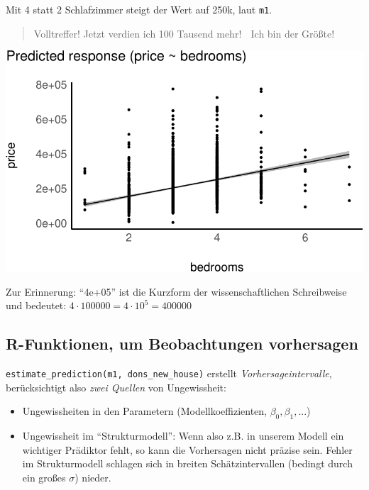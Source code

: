 \documentclass[
  a4paper,
  DIV=11]{scrreprt}
\providecommand{\tightlist}{%
  \setlength{\itemsep}{0pt}\setlength{\parskip}{0pt}}\usepackage{longtable,booktabs,array}
\theoremstyle{definition}
\theoremstyle{remark}
\begin{document}
Mit 4 statt 2 Schlafzimmer steigt der Wert auf 250k, laut \texttt{m1}.

\begin{quote}
Volltreffer! Jetzt verdien ich 100 Tausend mehr! 🤑 Ich bin der Größte!
🧑
\end{quote}

\includegraphics{./kausal_files/figure-pdf/plot-pred-m1-1.pdf}

\begin{tcolorbox}[enhanced jigsaw, colframe=quarto-callout-note-color-frame, title=\textcolor{quarto-callout-note-color}{\faInfo}\hspace{0.5em}{Hinweis}, breakable, leftrule=.75mm, coltitle=black, toptitle=1mm, bottomrule=.15mm, bottomtitle=1mm, opacityback=0, arc=.35mm, rightrule=.15mm, left=2mm, colbacktitle=quarto-callout-note-color!10!white, opacitybacktitle=0.6, toprule=.15mm, titlerule=0mm, colback=white]
Zur Erinnerung: ``4e+05'' ist die Kurzform der wissenschaftlichen
Schreibweise und bedeutet: \(4 \cdot 100000 = 4\cdot10^5 = 400000\)
\end{tcolorbox}

\hypertarget{r-funktionen-um-beobachtungen-vorhersagen}{%
\subsection{R-Funktionen, um Beobachtungen
vorhersagen}\label{r-funktionen-um-beobachtungen-vorhersagen}}

\texttt{estimate\_prediction(m1,\ dons\_new\_house)} erstellt
\emph{Vorhersageintervalle}, berücksichtigt also \emph{zwei Quellen} von
Ungewissheit:

\begin{itemize}
\tightlist
\item
  Ungewissheiten in den Parametern (Modellkoeffizienten,
  \(\beta_0, \beta_1, ...\))
\item
  Ungewissheit im ``Strukturmodell'': Wenn also z.B. in unserem Modell
  ein wichtiger Prädiktor fehlt, so kann die Vorhersagen nicht präzise
  sein. Fehler im Strukturmodell schlagen sich in breiten
  Schätzintervallen (bedingt durch ein großes \(\sigma\)) nieder.
\end{itemize}
\end{document}
